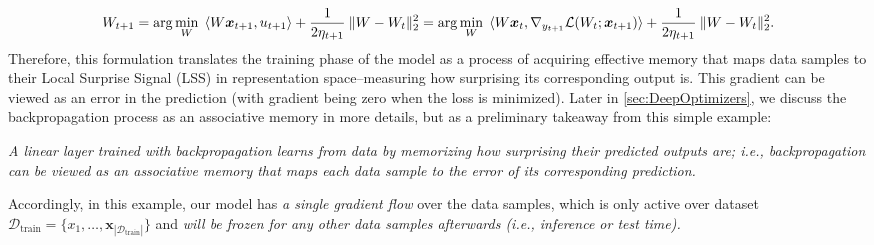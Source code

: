 \begin{align}
    W_{t+1} = \arg\min_{W} \:\:  \langle W \boldsymbol{x}_{t+1}, u_{t+1} \rangle + \frac{1}{2\eta_{t+1}}\:\|W - W_{t} \|^{2}_2 = \arg\min_{W} \:\:  \langle W \boldsymbol{x}_t, \nabla_{y_{t+1}} \mathcal{L}(W_t; \boldsymbol{x}_{t+1}) \rangle + \frac{1}{2\eta_{t+1}}\:\|W - W_{t} \|^{2}_2.
\end{align}
 Therefore, this formulation translates the training phase of the model as a process of acquiring effective memory that maps data samples to their Local Surprise Signal (LSS) in representation space–measuring how surprising its corresponding output is. This gradient can be viewed as an error in the prediction (with gradient being zero when the loss is minimized). Later in \autoref{sec:DeepOptimizers}, we discuss the backpropagation process as an associative memory in more details, but as a preliminary takeaway from this simple example: 

\vspace{8pt}
 \begin{myboxi}
     \textit{A linear layer trained with backpropagation learns from data by memorizing how surprising their predicted outputs are; i.e., backpropagation can be viewed as an associative memory that maps each data sample to the error of its corresponding prediction. }
 \end{myboxi}
\vspace{8pt}

 Accordingly, in this example, our model has \emph{a single gradient flow} over the data samples, which is only active over dataset $\mathcal{D}_{\text{train}} = \{x_1, \dots, \boldsymbol{x}_{|\mathcal{D}_{\text{train}}|}\}$ and \textit{will be frozen for any other data samples afterwards (i.e., inference or test time). }   




